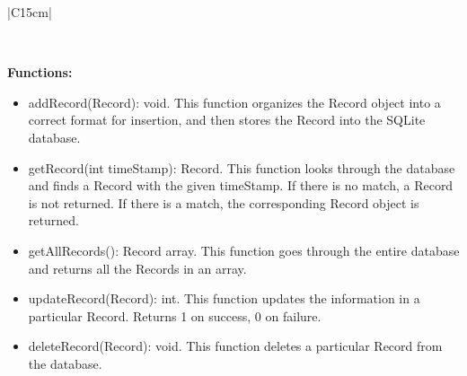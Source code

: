\documentclass[letterpaper,english, 12pt]{scrreprt}
\begin{document}
\begin{center}
\begin{tabular}{|C{15cm}|}
\begin{itemize}
                                \end{itemize} \\
                        \hline
                        \begin{flushleft}
                                \textbf{Functions: } \\
                        \end{flushleft}
                                \begin{itemize}
					\item addRecord(Record): void. This function organizes the Record object into a correct format for insertion, and then stores the Record into the SQLite database.
                                        \item getRecord(int timeStamp): Record. This function looks through the database and finds a Record with the given timeStamp. If there is no match, a Record is not returned. If there is a match, the corresponding Record object is returned.
                                        \item getAllRecords(): Record array. This function goes through the entire database and returns all the Records in an array.
                                        \item updateRecord(Record): int. This function updates the information in a particular Record. Returns 1 on success, 0 on failure.
                                        \item deleteRecord(Record): void. This function deletes a particular Record from the database.

                                \end{itemize} \\
                        \hline
        \end{tabular}
\end{center}
\end{document}
